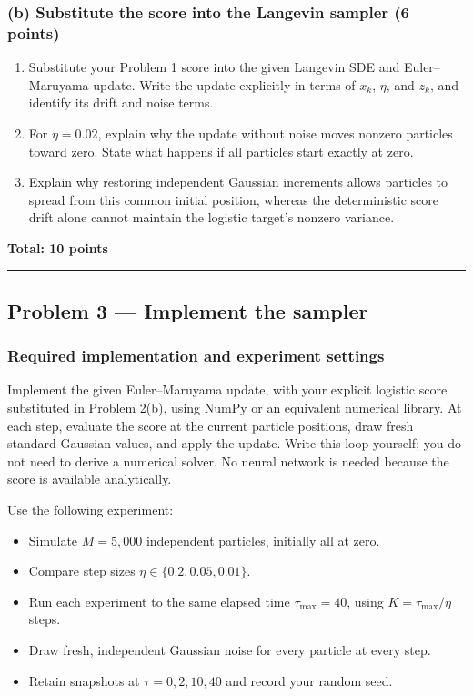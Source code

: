 \documentclass[11pt,a4paper]{article}
\providecommand{\tightlist}{\setlength{\itemsep}{0pt}\setlength{\parskip}{0pt}}
\begin{document}
\subsubsection{(b) Substitute the score into the Langevin sampler (6
points)}\label{b-substitute-the-score-into-the-langevin-sampler-6-points}

\begin{enumerate}
\def\labelenumi{\arabic{enumi}.}
\tightlist
\item
  Substitute your Problem 1 score into the given Langevin SDE and
  Euler--Maruyama update. Write the update explicitly in terms of
  \(x_k\), \(\eta\), and \(z_k\), and identify its drift and noise
  terms.
\item
  For \(\eta=0.02\), explain why the update without noise moves nonzero
  particles toward zero. State what happens if all particles start
  exactly at zero.
\item
  Explain why restoring independent Gaussian increments allows particles
  to spread from this common initial position, whereas the deterministic
  score drift alone cannot maintain the logistic target's nonzero
  variance.
\end{enumerate}

\noindent\textbf{Total: 10 points}

\bigskip\hrule\bigskip

\subsection{Problem 3 --- Implement the
sampler}\label{problem-3-implement-the-sampler}

\subsubsection{Required implementation and experiment
settings}\label{required-implementation-and-experiment-settings}

Implement the given Euler--Maruyama update, with your explicit logistic
score substituted in Problem 2(b), using NumPy or an equivalent
numerical library. At each step, evaluate the score at the current
particle positions, draw fresh standard Gaussian values, and apply the
update. Write this loop yourself; you do not need to derive a numerical
solver. No neural network is needed because the score is available
analytically.

Use the following experiment:

\begin{itemize}
\tightlist
\item
  Simulate \(M=5{,}000\) independent particles, initially all at zero.
\item
  Compare step sizes \(\eta\in\{0.2,0.05,0.01\}\).
\item
  Run each experiment to the same elapsed time \(\tau_{\max}=40\), using
  \(K=\tau_{\max}/\eta\) steps.
\item
  Draw fresh, independent Gaussian noise for every particle at every
  step.
\item
  Retain snapshots at \(\tau=0,2,10,40\) and record your random seed.
\end{itemize}
\end{document}
